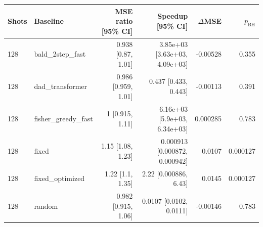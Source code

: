 \begin{tabular}{llrrrr}
\toprule
Shots & Baseline & MSE ratio [95\% CI] & Speedup [95\% CI] & $\Delta$MSE & $p_{\mathrm{BH}}$ \\
\midrule
128 & bald\_2step\_fast & 0.938 [0.87, 1.01] & 3.85e+03 [3.63e+03, 4.09e+03] & -0.00528 & 0.355 \\
128 & dad\_transformer & 0.986 [0.959, 1.01] & 0.437 [0.433, 0.443] & -0.00113 & 0.391 \\
128 & fisher\_greedy\_fast & 1 [0.915, 1.11] & 6.16e+03 [5.9e+03, 6.34e+03] & 0.000285 & 0.783 \\
128 & fixed & 1.15 [1.08, 1.23] & 0.000913 [0.000872, 0.000942] & 0.0107 & 0.000127 \\
128 & fixed\_optimized & 1.22 [1.1, 1.35] & 2.22 [0.000886, 6.43] & 0.0145 & 0.000127 \\
128 & random & 0.982 [0.915, 1.06] & 0.0107 [0.0102, 0.0111] & -0.00146 & 0.783 \\
\bottomrule
\end{tabular}
